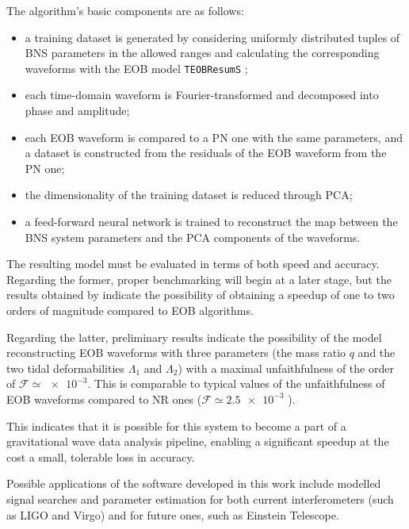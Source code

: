 \documentclass[main.tex]{subfiles}
\begin{document}
The algorithm's basic components are as follows:
\begin{itemize}
    \item a training dataset is generated by considering uniformly distributed tuples of \ac{BNS} parameters in the allowed ranges and calculating the corresponding waveforms with the \ac{EOB} model \texttt{TEOBResumS} \cite[]{nagarTimedomainEffectiveonebodyGravitational2018};
    \item each time-domain waveform is Fourier-transformed and decomposed into phase and amplitude;
    \item each \ac{EOB} waveform is compared to a \ac{PN} one with the same parameters, and a dataset is constructed from the residuals of the \ac{EOB} waveform from the \ac{PN} one;
    \item the dimensionality of the training dataset is reduced through \ac{PCA};
    \item a feed-forward neural network is trained to reconstruct the map between the \ac{BNS} system parameters and the \ac{PCA} components of the waveforms. 
\end{itemize}

The resulting model must be evaluated in terms of both speed and accuracy.
Regarding the former, proper benchmarking will begin at a later stage, but the results obtained by \textcite[]{schmidtMachineLearningGravitational2020} indicate the possibility of obtaining a speedup of one to two orders of magnitude compared to EOB algorithms. 

Regarding the latter, preliminary results indicate the possibility of the model reconstructing \ac{EOB} waveforms with three parameters (the mass ratio \(q\) and the two tidal deformabilities \(\Lambda_1\) and \(\Lambda_2 \)) with a maximal unfaithfulness of the order of \(\mathcal{F} \simeq \num{e-3}\).
This is comparable to typical values of the unfaithfulness of EOB waveforms compared to \ac{NR} ones (\(\mathcal{F} \simeq \num{2.5e-3}\) \cite[]{nagarTimedomainEffectiveonebodyGravitational2018}).

This indicates that it is possible for this system to become a part of a gravitational wave data analysis pipeline, enabling a significant speedup at the cost a small, tolerable loss in accuracy.

Possible applications of the software developed in this work include modelled signal searches and parameter estimation for both current interferometers (such as LIGO and Virgo) and for future ones, such as Einstein Telescope.
\end{document}

